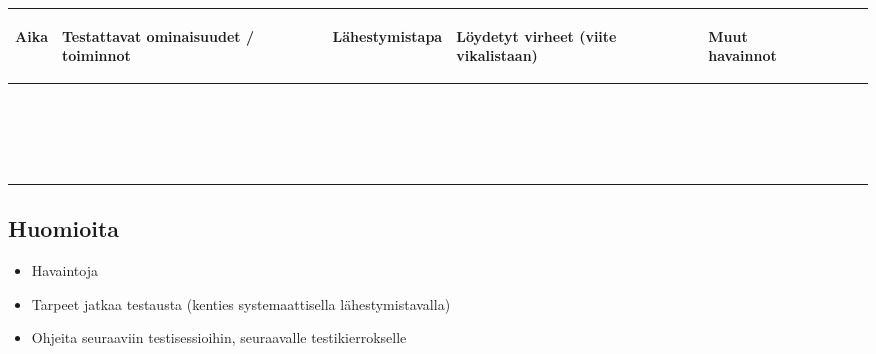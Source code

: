 \begin{landscape}
\begin{longtable}{|>{\raggedright}p{2.4cm}|>{\raggedright}p{5.7cm}|>{\raggedright}p{4.2cm}|>{\raggedright}p{4.2cm}|>{\raggedright}p{4.2cm}|}
	\hline
	\begin{bfseries}Aika\end{bfseries} & \begin{bfseries}Testattavat ominaisuudet / toiminnot\end{bfseries} & \begin{bfseries}Lähestymistapa\end{bfseries} & \begin{bfseries}Löydetyt virheet (viite vikalistaan)\end{bfseries} & \begin{bfseries}Muut havainnot\end{bfseries} \endhead
	\hline
	 &  &  &  &  \\
	\hline
	 &  &  &  &  \\
	\hline
	 &  &  &  &  \\
	\hline
	 &  &  &  &  \\
	\hline
	 &  &  &  &  \\
	\hline
	 &  &  &  &  \\
	\hline
	 &  &  &  &  \\
	\hline
	 &  &  &  &  \\
	\hline
	 &  &  &  &  \\
	\hline
	 &  &  &  &  \\
	\hline
	 &  &  &  &  \\
	\hline
	 &  &  &  &  \\
	\hline
	 &  &  &  &  \\
	\hline
	 &  &  &  &  \\
	\hline
	 &  &  &  &  \\
	\hline
	 &  &  &  &  \\
	\hline
	 &  &  &  &  \\
	\hline
	 &  &  &  &  \\
	\hline
	 &  &  &  &  \\
	\hline
	 &  &  &  &  \\
	\hline
\end{longtable}

\subsection{Huomioita}

\begin{itemize}
	\item Havaintoja
	\item Tarpeet jatkaa testausta (kenties systemaattisella lähestymistavalla)
	\item Ohjeita seuraaviin testisessioihin, seuraavalle testikierrokselle
\end{itemize}

\end{landscape}